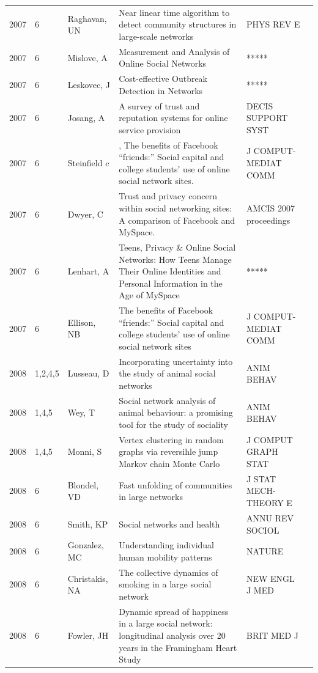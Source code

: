 \documentclass[11pt]{article} %
\begin{document}
\begin{longtable}{p{0.8cm}|p{1.25cm}|p{2.8cm}|p{7.5cm}|p{3cm}l}
2007&	6&	Raghavan, UN&	 Near linear time algorithm to detect community structures in large-scale networks&         	PHYS REV E\\
2007&	6&	Mislove, A&	 Measurement and Analysis of Online Social Networks&         	*****\\
2007&	6&	Leskovec, J&	 Cost-effective Outbreak Detection in Networks&         	*****\\
2007&	6&	Josang, A&	 A survey of trust and reputation systems for online service provision&         	DECIS SUPPORT SYST\\
2007&	6&	Steinfield c&,	The benefits of Facebook “friends:” Social capital and college students’ use of online social network sites.&         	J COMPUT-MEDIAT COMM\\
2007&	6&	Dwyer, C&	Trust and privacy concern within social networking sites: A comparison of Facebook and MySpace.&         	AMCIS 2007 proceedings\\
2007&	6&	Lenhart, A&	 Teens, Privacy \& Online Social Networks: How Teens Manage Their Online Identities and Personal Information in the Age of MySpace&         	*****\\
2007&	6&	Ellison, NB &	The benefits of Facebook “friends:” Social capital and college students’ use of online social network sites&         	J COMPUT-MEDIAT COMM\\
2008&	1,2,4,5&	Lusseau, D&	 Incorporating uncertainty into the study of animal social networks&         	ANIM BEHAV\\
2008&	1,4,5&	Wey, T&	 Social network analysis of animal behaviour: a promising tool for the study of sociality&         	ANIM BEHAV\\
2008&	1,4,5&	Monni, S&	 Vertex clustering in random graphs via reversihle jump Markov chain Monte Carlo&         	J COMPUT GRAPH STAT\\
2008&	6&	Blondel, VD&	 Fast unfolding of communities in large networks&         	J STAT MECH-THEORY E\\
2008&	6&	Smith, KP&	 Social networks and health&         	ANNU REV SOCIOL\\
2008&	6&	Gonzalez, MC&	 Understanding individual human mobility patterns&         	NATURE\\
2008&	6&	Christakis, NA&	 The collective dynamics of smoking in a large social network&         	NEW ENGL J MED\\
2008&	6&	Fowler, JH&	 Dynamic spread of happiness in a large social network: longitudinal analysis over 20 years in the Framingham Heart Study&         	BRIT MED J\\

\end{longtable}
\end{document}
